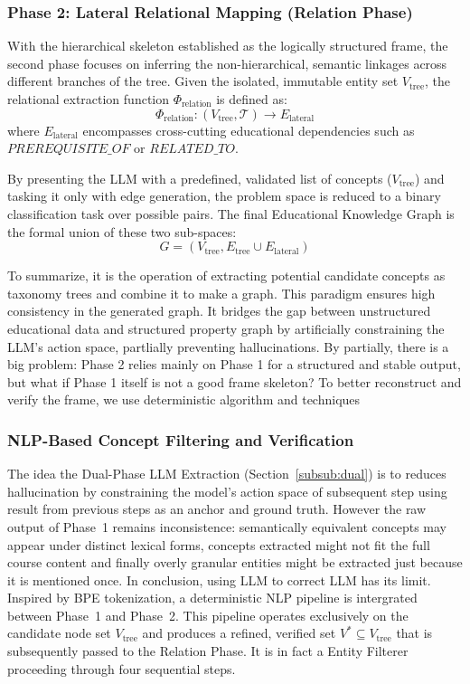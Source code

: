 \subsubsection*{Phase 2: Lateral Relational Mapping (Relation Phase)}

With the hierarchical skeleton established as the logically structured frame, the second phase focuses on inferring the non-hierarchical, semantic linkages 
across different branches of the tree. Given the isolated, immutable entity set $V_{\text{tree}}$, the relational extraction function $\Phi_{\text{relation}}$ is 
defined as:
\begin{equation}
    \Phi_{\text{relation}}: (V_{\text{tree}}, \mathcal{T}) \rightarrow E_{\text{lateral}}
\end{equation}
where $E_{\text{lateral}}$ encompasses cross-cutting educational dependencies such as $ {PREREQUISITE\_OF}$ or $ {RELATED\_TO}$.

By presenting the LLM with a predefined, validated list of concepts ($V_{\text{tree}}$) and tasking it  {only} with edge generation, the problem space is reduced to a binary classification task over possible pairs. The final Educational Knowledge Graph is the formal union of these two sub-spaces: 
\begin{equation}
    G = (V_{\text{tree}}, E_{\text{tree}} \cup E_{\text{lateral}})
\end{equation}

To summarize, it is the operation of extracting potential candidate concepts as taxonomy trees and combine it to make a graph. This paradigm ensures high consistency 
in the generated graph. It bridges the gap between unstructured educational data and structured property graph by artificially 
constraining the LLM's action space, partlially preventing hallucinations. By partially, there is a big problem: Phase 2 relies mainly on Phase 1 for a structured and stable 
output, but what if Phase 1 itself is not a good frame skeleton? To better reconstruct and verify the frame, we use deterministic algorithm and techniques


\subsubsection{NLP-Based Concept Filtering and Verification}

The idea the Dual-Phase LLM Extraction (Section~\ref{subsub:dual}) is to reduces hallucination by constraining the model's action space of subsequent step using 
result from previous steps as an anchor and ground truth. However the raw output 
of Phase~1 remains inconsistence: semantically equivalent concepts may appear under distinct lexical forms, concepts extracted might not fit the full course content and
finally overly granular entities might be extracted just because it is mentioned once. In conclusion, using LLM to correct LLM has its limit. 
Inspired by BPE tokenization, a deterministic NLP pipeline is intergrated between Phase~1 
and Phase~2. This pipeline operates exclusively on the candidate node set $V_{\text{tree}}$ and produces a refined, verified set $V^{*} \subseteq V_{\text{tree}}$ 
that is subsequently passed to the Relation Phase. It is in fact a Entity Filterer proceeding through four sequential steps.

